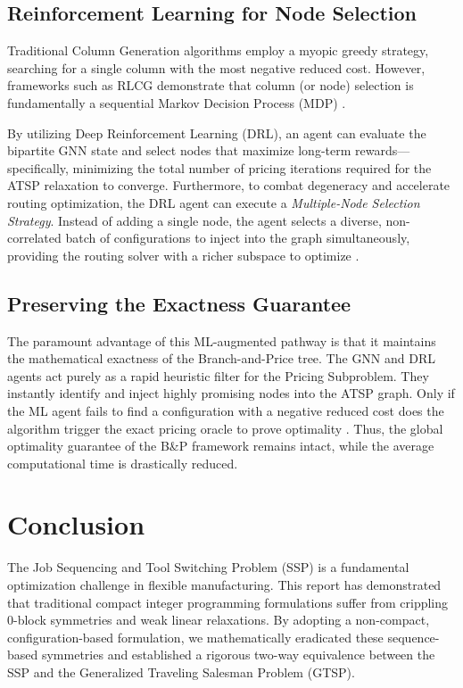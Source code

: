 \documentclass[12pt]{article}
\begin{document}
	\subsection{Reinforcement Learning for Node Selection}
	Traditional Column Generation algorithms employ a myopic greedy strategy, searching for a single column with the most negative reduced cost. However, frameworks such as RLCG demonstrate that column (or node) selection is fundamentally a sequential Markov Decision Process (MDP) \parencite{Chi2022}. 
	
	By utilizing Deep Reinforcement Learning (DRL), an agent can evaluate the bipartite GNN state and select nodes that maximize long-term rewards---specifically, minimizing the total number of pricing iterations required for the ATSP relaxation to converge. Furthermore, to combat degeneracy and accelerate routing optimization, the DRL agent can execute a \textit{Multiple-Node Selection Strategy}. Instead of adding a single node, the agent selects a diverse, non-correlated batch of configurations to inject into the graph simultaneously, providing the routing solver with a richer subspace to optimize \parencite{Yuan2023}.
	
	\subsection{Preserving the Exactness Guarantee}
	The paramount advantage of this ML-augmented pathway is that it maintains the mathematical exactness of the Branch-and-Price tree. The GNN and DRL agents act purely as a rapid heuristic filter for the Pricing Subproblem. They instantly identify and inject highly promising nodes into the ATSP graph. Only if the ML agent fails to find a configuration with a negative reduced cost does the algorithm trigger the exact pricing oracle to prove optimality \parencite{Vaclavik2018}. Thus, the global optimality guarantee of the B\&P framework remains intact, while the average computational time is drastically reduced.
	
	\section{Conclusion}
	
	The Job Sequencing and Tool Switching Problem (SSP) is a fundamental optimization challenge in flexible manufacturing. This report has demonstrated that traditional compact integer programming formulations suffer from crippling 0-block symmetries and weak linear relaxations. By adopting a non-compact, configuration-based formulation, we mathematically eradicated these sequence-based symmetries and established a rigorous two-way equivalence between the SSP and the Generalized Traveling Salesman Problem (GTSP).
	
\end{document}
